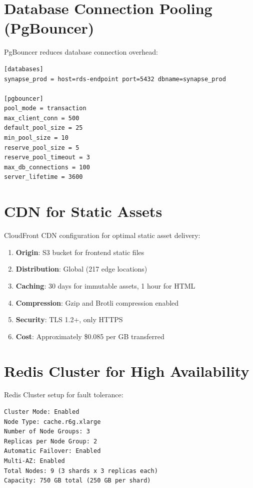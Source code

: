 \documentclass{report}
\begin{document}
\section{Database Connection Pooling (PgBouncer)}

PgBouncer reduces database connection overhead:

\begin{lstlisting}[caption=PgBouncer Configuration]
[databases]
synapse_prod = host=rds-endpoint port=5432 dbname=synapse_prod

[pgbouncer]
pool_mode = transaction
max_client_conn = 500
default_pool_size = 25
min_pool_size = 10
reserve_pool_size = 5
reserve_pool_timeout = 3
max_db_connections = 100
server_lifetime = 3600
\end{lstlisting}

\section{CDN for Static Assets}

CloudFront CDN configuration for optimal static asset delivery:

\begin{enumerate}
  \item \textbf{Origin}: S3 bucket for frontend static files
  \item \textbf{Distribution}: Global (217 edge locations)
  \item \textbf{Caching}: 30 days for immutable assets, 1 hour for HTML
  \item \textbf{Compression}: Gzip and Brotli compression enabled
  \item \textbf{Security}: TLS 1.2+, only HTTPS
  \item \textbf{Cost}: Approximately \$0.085 per GB transferred
\end{enumerate}

\section{Redis Cluster for High Availability}

Redis Cluster setup for fault tolerance:

\begin{lstlisting}[caption=Redis Cluster Configuration]
Cluster Mode: Enabled
Node Type: cache.r6g.xlarge
Number of Node Groups: 3
Replicas per Node Group: 2
Automatic Failover: Enabled
Multi-AZ: Enabled
Total Nodes: 9 (3 shards x 3 replicas each)
Capacity: 750 GB total (250 GB per shard)
\end{lstlisting}
\end{document}

